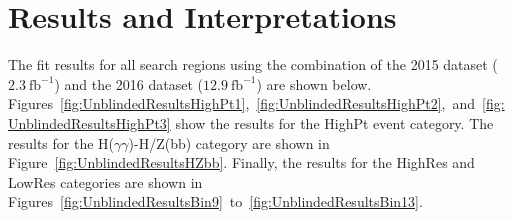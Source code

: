 \section{Results and Interpretations}
\label{sec:results}

The fit results for all search regions using the combination of the 2015 dataset ($2.3~\mathrm{fb}^{-1}$)
and the 2016 dataset ($12.9~\mathrm{fb}^{-1}$) are shown below.
Figures~\ref{fig:UnblindedResultsHighPt1},~\ref{fig:UnblindedResultsHighPt2},~and~\ref{fig:UnblindedResultsHighPt3}
show the results for the HighPt event category. 
The results for the H($\gamma\gamma$)-H/Z(bb) category are shown in Figure~\ref{fig:UnblindedResultsHZbb}.
Finally, the results for the HighRes and LowRes categories are shown in 
Figures~\ref{fig:UnblindedResultsBin9}~to~\ref{fig:UnblindedResultsBin13}.


